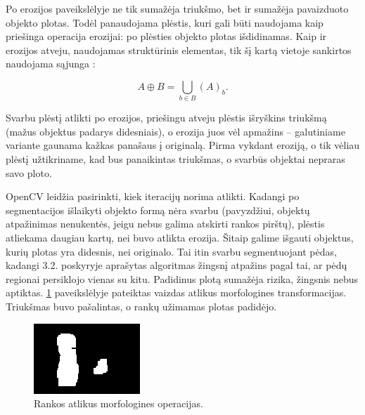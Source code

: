 \documentclass{VUMIFPSkursinis}
\begin{document}
Po erozijos paveikslėlyje ne tik sumažėja triukšmo, bet ir sumažėja pavaizduoto objekto plotas. Todėl panaudojama plėstis, kuri gali būti naudojama kaip priešinga operacija erozijai: po plėsties objekto plotas išdidinamas. Kaip ir erozijos atveju, naudojamas struktūrinis elementas, tik šį kartą vietoje sankirtos naudojama sąjunga \cite{ImageAnalysisMorph}:

\begin{equation}\label{eq:plestis}
A \oplus B = \bigcup_ {b \in B } (A)_{b} .
\end{equation}

Svarbu plėstį atlikti po erozijos, priešingu atveju plėstis išryškins triukšmą (mažus objektus padarys didesniais), o erozija juos vėl apmažins – galutiniame variante gaunama kažkas panašaus į originalą. Pirma vykdant eroziją, o tik vėliau plėstį užtikriname, kad bus panaikintas triukšmas, o svarbūs objektai nepraras savo ploto. 

OpenCV leidžia pasirinkti, kiek iteracijų norima atlikti. Kadangi po segmentacijos išlaikyti objekto formą nėra svarbu (pavyzdžiui, objektų atpažinimas nenukentės, jeigu nebus galima atskirti rankos pirštų), plėstis atliekama daugiau kartų, nei buvo atlikta erozija. Šitaip galime išgauti objektus, kurių plotas yra didesnis, nei originalo. Tai itin svarbu segmentuojant pėdas, kadangi 3.2. poskyryje aprašytas algoritmas žingsnį atpažins pagal tai, ar pėdų regionai persiklojo vienas su kitu. Padidinus plotą sumažėja rizika, žingsnis nebus aptiktas. \ref{imgs:morphrank} paveikslėlyje pateiktas vaizdas atlikus morfologines transformacijas. Triukšmas buvo pašalintas, o rankų užimamas plotas padidėjo.
\begin{figure}[H]
	\centering
	\includegraphics[scale=1]{imgs/morphrank}
	\caption{Rankos atlikus morfologines operacijas.}
	\label{imgs:morphrank}
\end{figure}
\end{document}
